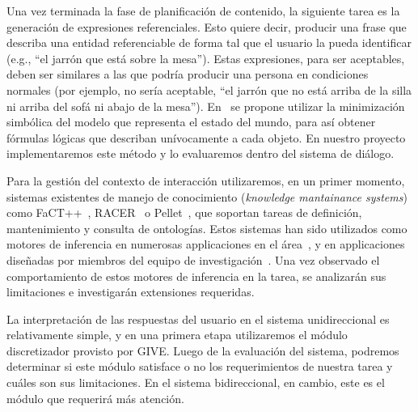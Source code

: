 Una vez terminada la fase de planificaci\'on de contenido, la siguiente tarea
es la generaci\'on de expresiones referenciales. Esto quiere decir, producir una
frase que describa una entidad referenciable de forma tal que el usuario
la pueda identificar (e.g., ``el jarr\'on que est\'a sobre la mesa'').
Estas expresiones, para ser aceptables, deben ser similares a las que podr\'ia
producir una persona en condiciones normales (por ejemplo, no ser\'ia aceptable,
``el jarr\'on que no est\'a arriba de la silla ni arriba del
sof\'a ni abajo de la mesa'').  En~\citep{AKS08} se propone utilizar la
minimizaci\'on simb\'olica del modelo que representa
el estado del mundo, para as\'i obtener f\'ormulas l\'ogicas que describan
un\'ivocamente a cada objeto. En nuestro proyecto implementaremos este m\'etodo
y lo evaluaremos dentro del sistema de di\'alogo. 

Para la gesti\'on del contexto de interacci\'on utilizaremos, en un primer
momento, sistemas existentes de manejo de conocimiento (\emph{knowledge mantainance
systems}) como
FaCT++~\citep{horr:fact99},
RACER~\citep{haar:race99} o Pellet~\citep{siri:pell06}, que soportan tareas de
definici\'on, mantenimiento y consulta de ontolog\'ias.  Estos sistemas
han sido utilizados como motores de inferencia
en numerosas applicaciones en el \'area~\citep{franconi03,koller04}, y en
applicaciones
dise\~nadas por miembros del equipo de
investigaci\'on~\citep{benotti07,benotti09b}.  Una vez observado el
comportamiento de
estos motores de inferencia en la tarea, se analizar\'an sus limitaciones
e investigar\'an extensiones requeridas.  

La interpretaci\'on de las respuestas del usuario en el sistema unidireccional
es relativamente simple, y en una primera etapa utilizaremos el m\'odulo
discretizador provisto por GIVE.  Luego de la evaluaci\'on del sistema,
podremos determinar si este m\'odulo satisface o no los requerimientos de 
nuestra tarea y cu\'ales son sus limitaciones.  En el sistema bidireccional,
en cambio, este es el m\'odulo que requerir\'a m\'as atenci\'on. 

